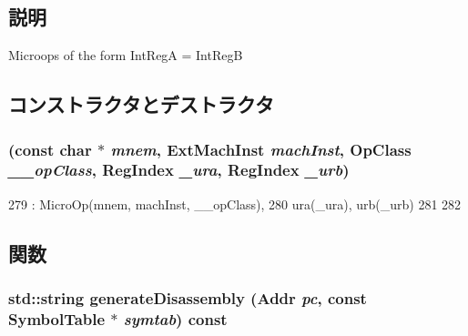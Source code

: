 \subsection{説明}
Microops of the form IntRegA = IntRegB 

\subsection{コンストラクタとデストラクタ}
\hypertarget{classArmISA_1_1MicroIntMov_a21c0c6bc858b449669b48135356ccb7b}{
\subsubsection[{MicroIntMov}]{ (const char $\ast$ {\em mnem}, \/  {\bf ExtMachInst} {\em machInst}, \/  OpClass {\em \_\-\_\-opClass}, \/  {\bf RegIndex} {\em \_\-ura}, \/  {\bf RegIndex} {\em \_\-urb})}}
\label{classArmISA_1_1MicroIntMov_a21c0c6bc858b449669b48135356ccb7b}



\begin{DoxyCode}
279             : MicroOp(mnem, machInst, __opClass),
280               ura(_ura), urb(_urb)
281     {
282     }
\end{DoxyCode}


\subsection{関数}
\hypertarget{classArmISA_1_1MicroIntMov_a95d323a22a5f07e14d6b4c9385a91896}{
\subsubsection[{generateDisassembly}]{\setlength{\rightskip}{0pt plus 5cm}std::string generateDisassembly ({\bf Addr} {\em pc}, \/  const SymbolTable $\ast$ {\em symtab}) const}}
\label{classArmISA_1_1MicroIntMov_a95d323a22a5f07e14d6b4c9385a91896}


